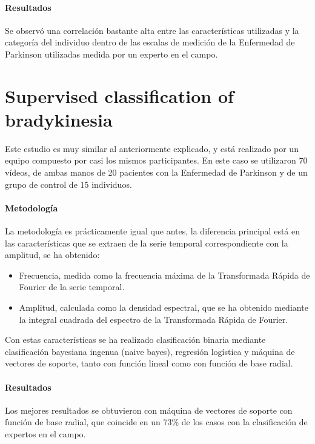 \paragraph{Resultados}

Se observó una correlación bastante alta entre las características utilizadas y
la categoría del individuo dentro de las escalas de medición de la Enfermedad de
Parkinson utilizadas medida por un experto en el campo.


\section{Supervised classification of bradykinesia}

Este estudio \cite{williams2020supervised} es muy similar al anteriormente
explicado, y está realizado por un equipo compuesto por casi los mismos
participantes. En este caso se utilizaron 70 vídeos, de ambas manos de 20
pacientes con la Enfermedad de Parkinson y de un grupo de control de 15
individuos.


\paragraph{Metodología}

La metodología es prácticamente igual que antes, la diferencia principal está en
las características que se extraen de la serie temporal correspondiente con la
amplitud, se ha obtenido:

\begin{itemize}
    \item Frecuencia, medida como la frecuencia máxima de la Transformada Rápida
          de Fourier de la serie temporal.
    \item Amplitud, calculada como la densidad espectral, que se ha obtenido
          mediante la integral cuadrada del espectro de la Transformada Rápida
          de Fourier.
\end{itemize}

Con estas características se ha realizado clasificación binaria mediante
clasificación bayesiana ingenua (naive bayes), regresión logística y máquina de
vectores de soporte, tanto con función lineal como con función de base radial.


\paragraph{Resultados}

Los mejores resultados se obtuvieron con máquina de vectores de soporte con
función de base radial, que coincide en un 73\% de los casos con la
clasificación de expertos en el campo.
